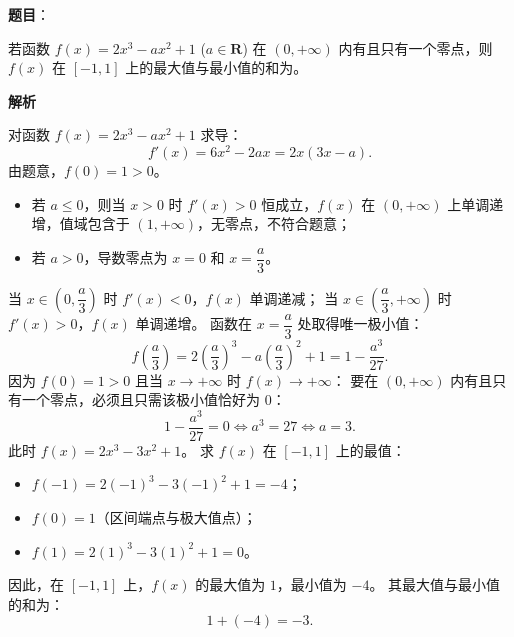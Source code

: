 \begin{answer}

\textbf{题目}：

若函数 $f(x) = 2x^3 - ax^2 + 1$ ($a \in \mathbf{R}$) 在 $(0, +\infty)$ 内有且只有一个零点，则 $f(x)$ 在 $[-1, 1]$ 上的最大值与最小值的和为\gkblank{}。

\textbf{解析}

对函数 $f(x) = 2x^3 - ax^2 + 1$ 求导：
\nopagebreak[4]
\[f'(x) = 6x^2 - 2ax = 2x(3x - a).\]
由题意，$f(0) = 1 > 0$。
\begin{itemize}
\item 若 $a \leqslant 0$，则当 $x > 0$ 时 $f'(x) > 0$ 恒成立，$f(x)$ 在 $(0, +\infty)$ 上单调递增，值域包含于 $(1, +\infty)$，无零点，不符合题意；
\item 若 $a > 0$，导数零点为 $x = 0$ 和 $x = \dfrac{a}{3}$。
\end{itemize}
  当 $x \in \left(0, \dfrac{a}{3}\right)$ 时 $f'(x) < 0$，$f(x)$ 单调递减；
  当 $x \in \left(\dfrac{a}{3}, +\infty\right)$ 时 $f'(x) > 0$，$f(x)$ 单调递增。
  函数在 $x = \dfrac{a}{3}$ 处取得唯一极小值：
\nopagebreak[4]
\[f\left(\frac{a}{3}\right) = 2\left(\frac{a}{3}\right)^3 - a\left(\frac{a}{3}\right)^2 + 1 = 1 - \frac{a^3}{27}.\]
  因为 $f(0) = 1 > 0$ 且当 $x \to +\infty$ 时 $f(x) \to +\infty$：
  要在 $(0, +\infty)$ 内有且只有一个零点，必须且只需该极小值恰好为 0：
\nopagebreak[4]
\[1 - \frac{a^3}{27} = 0 \iff a^3 = 27 \iff a = 3.\]
此时 $f(x) = 2x^3 - 3x^2 + 1$。
求 $f(x)$ 在 $[-1, 1]$ 上的最值：
\begin{itemize}
\item $f(-1) = 2(-1)^3 - 3(-1)^2 + 1 = -4$；
\item $f(0) = 1$（区间端点与极大值点）；
\item $f(1) = 2(1)^3 - 3(1)^2 + 1 = 0$。
\end{itemize}
因此，在 $[-1, 1]$ 上，$f(x)$ 的最大值为 $1$，最小值为 $-4$。
其最大值与最小值的和为：
\nopagebreak[4]
\[1 + (-4) = -3.\]


\end{answer}
